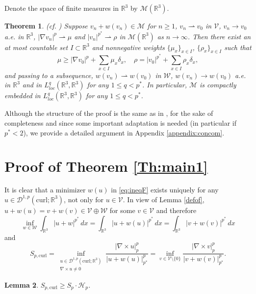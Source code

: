 \documentclass[12pt,leqno,twoside]{amsart}
\newtheorem{Th}{Theorem}[section]
\newtheorem{Lem}[Th]{Lemma}
\def\R{\mathbb{R}}
\def\curl{\mathrm{curl}}
\def\Wc{\mathscr{W}}
\def\rh{\rightharpoonup}
\newcommand{\cD}{{\mathcal D}}
\newcommand{\cH}{{\mathcal H}}
\newcommand{\cM}{{\mathcal M}}
\newcommand{\cV}{{\mathcal V}}
\newcommand{\cW}{{\mathcal W}}
\def\r{\mathbb{R}}
\def\r3{\mathbb{R}^3}
\def\Wc{\cD^{1,p}(\curl;\R^3)}
\def\rh{\rightharpoonup}
\def\ir3{\int_{\r3}}
\def\curlop{\nabla\times}
\newcommand{\weakto}{\rightharpoonup}
\numberwithin{equation}{section}
\begin{document}
Denote the space of finite measures in $\R^3$ by $\cM(\R^3)$.


\begin{Th}(cf. \cite[Theorem 3.1]{MedSz})  \label{Th:Concentration}
	Suppose $v_n+w(v_n)\in\cM$ for $n\geq 1$,  $v_n\weakto v_0$ in $\cV$, $v_n\to v_0$ a.e. in $\R^3$, $|\nabla v_n|^p\weakto \mu$ and $|v_n|^{p^*}\rh \rho$
	 in $\cM(\R^3)$ as $n\to\infty$. Then
	there exist an at most countable set $I\subset\R^3$ and nonnegative weights $\{\mu_x\}_{x\in I}$, $\{\rho_x\}_{x\in I}$ such that
	$$
	\mu\geq |\nabla v_0|^p+\sum_{x\in I}\mu_x\delta_x, \quad \rho = |v_0|^{p^*} + \sum_{x\in I}\rho_x\delta_x,
	$$
	 and passing to a subsequence, $w(v_n)\rh w(v_0)$ in $\cW$, $w(v_n)\to w(v_0)$ a.e. in $\R^3$ and in $L^q_{loc}(\R^3,\R^3)$ for any $1\leq  q<p^*$. In particular, $\cM$ is compactly embedded  in $L^q_{loc}(\R^3,\R^3)$ for any $1\leq  q<p^*$.
\end{Th}

Although the structure of the proof is the same as in \cite[Theorem 3.1]{MedSz}, for the sake of completeness and since some important adaptation is needed (in particular if $p^*<2$), we provide a detailed argument in Appendix \ref{appendix:concom}. 





\section{Proof of Theorem \ref{Th:main1}} \label{sec:Om=R3}


It is clear that a minimizer $w(u)$ in \eqref{eq:ineqF} exists uniquely for any $u\in \Wc$, not only for $u\in \cV$. In view of Lemma \ref{defof}, $u+w(u)=v+w(v)\in \cV\oplus\cW$ for some $v\in\cV$ and therefore
\begin{equation} \label{eqeq}
\inf_{w\in\cW} \ir3 |u+w|^{p^*}\,dx = \ir3|u+w(u)|^{p^*}\,dx = \ir3|v+w(v)|^{p^*}\,dx
\end{equation}
and
\begin{equation} \label{eq:scurl}
S_{p,\curl} = \inf_{\substack{u\in \Wc \\ \curlop u\neq 0}} \frac{|\nabla\times u|_p^p}{|u+w(u)|_{p^*}^p} = \inf_{v\in \cV\setminus\{0\}} \frac{|\curlop v|_p^p}{|v+w(v)|_{p^*}^p}.
\end{equation}

\begin{Lem}\label{lemmaScurlS}
$S_{p,\curl}\geq S_p\cdot\cH_p$.
\end{Lem}
\end{document}
